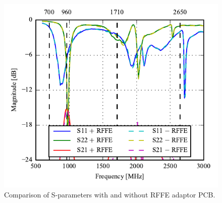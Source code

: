 \begin{figure}[htbp]
    \centering
    \includegraphics{img/optical_rffe/compare_sparams2}
    \caption{Comparison of S-parameters with and without RFFE adaptor PCB. }
    \label{fig:rffe_test_results2}
\end{figure}
